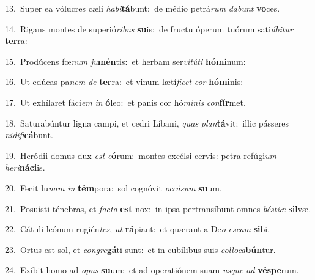 {\numbfont\textcolor{\numbcolor}{13.}}~Super ea vólucres cæli \textit{ha}\-\textit{bi}\textbf{tá}bunt:~\star de médio petrá\textit{rum} \textit{da}\-\textit{bunt} \textbf{vo}\-ces.\par
{\numbfont\textcolor{\numbcolor}{14.}}~Rigans montes de superió\-\textit{ri}\-\textit{bus} \textbf{su}\-is:~\star de fructu óperum tuórum sati\-\textit{á}\-\textit{bi}\textit{tur} \textbf{ter}\-ra:\par
{\numbfont\textcolor{\numbcolor}{15.}}~Prodúcens fœ\textit{num} \textit{ju}\-\textbf{mén}tis:~\star et herbam ser\-\textit{vi}\-\textit{tú}\textit{ti} \textbf{hó}\-\textbf{mi}num:\par
{\numbfont\textcolor{\numbcolor}{16.}}~Ut edúcas pa\textit{nem} \textit{de} \textbf{ter}\-ra:~\star et vinum lætí\-\textit{fi}\-\textit{cet} \textit{cor} \textbf{hó}\-\textbf{mi}nis:\par
{\numbfont\textcolor{\numbcolor}{17.}}~Ut exhílaret fáci\textit{em} \textit{in} \textbf{ó}\-leo:~\star et panis cor hó\-\textit{mi}\-\textit{nis} \textit{con}\-\textbf{fír}met.\par
{\numbfont\textcolor{\numbcolor}{18.}}~Saturabúntur ligna campi, et cedri Líbani, \textit{quas} \textit{plan}\-\textbf{tá}vit:~\star illic pásseres \textit{ni}\-\textit{di}\textit{fi}\textbf{cá}bunt.\par
{\numbfont\textcolor{\numbcolor}{19.}}~Heródii domus dux \textit{est} \textit{e}\-\textbf{ó}rum:~\star montes excélsi cervis: petra refúgi\textit{um} \textit{he}\-\textit{ri}\textbf{ná}\textbf{ci}is.\par
{\numbfont\textcolor{\numbcolor}{20.}}~Fecit lu\textit{nam} \textit{in} \textbf{tém}\-pora:~\star sol cognóvit \textit{oc}\-\textit{cá}\textit{sum} \textbf{su}\-um.\par
{\numbfont\textcolor{\numbcolor}{21.}}~Posuísti ténebras, et \textit{fac}\-\textit{ta} \textbf{est} nox:~\star in ipsa pertransíbunt omnes \textit{bés}\-\textit{ti}\textit{æ} \textbf{sil}\-væ.\par
{\numbfont\textcolor{\numbcolor}{22.}}~Cátuli leónum rugién\-\textit{tes}\-, \textit{ut} \textbf{rá}\-piant:~\star et quærant a De\textit{o} \textit{es}\-\textit{cam} \textbf{si}\-bi.\par
{\numbfont\textcolor{\numbcolor}{23.}}~Ortus est sol, et \textit{con}\-\textit{gre}\textbf{gá}ti sunt:~\star et in cubílibus suis \textit{col}\-\textit{lo}\textit{ca}\textbf{bún}tur.\par
{\numbfont\textcolor{\numbcolor}{24.}}~Exíbit homo ad \textit{o}\-\textit{pus} \textbf{su}\-um:~\star et ad operatiónem suam \textit{us}\-\textit{que} \textit{ad} \textbf{vés}\-\textbf{pe}rum.\par
